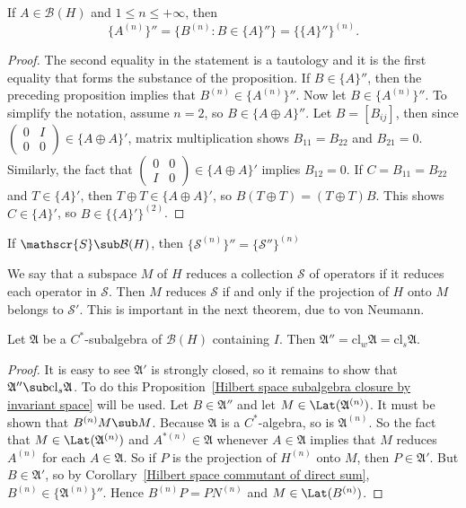 \begin{proposition}
If $A\in\mathcal{B}(H)$ and $1\leq n\leq+\infty$, then
\[\{A^{(n)}\}''=\{B^{(n)}:B\in\{A\}''\}=\{\{A\}''\}^{(n)}.\]
\end{proposition}
\begin{proof}
The second equality in the statement is a tautology and it is the first equality that forms the substance of the proposition. If $B\in\{A\}''$, then the preceding proposition implies that $B^{(n)}\in\{A^{(n)}\}''$. Now let $B\in\{A^{(n)}\}''$. To simplify the notation, assume $n=2$, so $B\in\{A\oplus A\}''$. Let $B=[B_{ij}]$, then since $(\begin{smallmatrix}0&I\\0&0\end{smallmatrix})\in\{A\oplus A\}'$, matrix multiplication shows $B_{11}=B_{22}$ and $B_{21}=0$. Similarly, the fact that $(\begin{smallmatrix}0&0\\I&0\end{smallmatrix})\in\{A\oplus A\}'$ implies $B_{12}=0$. If $C=B_{11}=B_{22}$ and $T\in\{A\}'$, then $T\oplus T\in\{A\oplus A\}'$, so $B(T\oplus T)=(T\oplus T)B$. This shows $C\in\{A\}'$, so $B\in\{\{A\}'\}^{(2)}$.
\end{proof}
\begin{corollary}\label{Hilbert space commutant of direct sum}
If $\mathscr{S}\sub\mathcal{B}(H)$, then $\{\mathcal{S}^{(n)}\}''=\{\mathscr{S}''\}^{(n)}$
\end{corollary}
We say that a subspace $M$ of $H$ reduces a collection $\mathscr{S}$ of operators if it reduces each operator in $\mathscr{S}$. Then $M$ reduces $\mathscr{S}$ if and only if the projection of $H$ onto $M$ belongs to $\mathscr{S}'$. This is important in the next theorem, due to von Neumann.
\begin{theorem}\label{Hilbert space bicommutant}
Let $\mathfrak{A}$ be a $C^*$-subalgebra of $\mathcal{B}(H)$ containing $I$. Then $\mathfrak{A}''=\mathrm{cl}_w\mathfrak{A}=\mathrm{cl}_s\mathfrak{A}$.
\end{theorem}
\begin{proof}
It is easy to see $\mathfrak{A}'$ is strongly closed, so it remains to show that $\mathfrak{A}''\sub\mathrm{cl}_s\mathfrak{A}$. To do this Proposition~\ref{Hilbert space subalgebra closure by invariant space} will be used. Let $B\in\mathfrak{A}''$ and let $M\in\Lat(\mathfrak{A}^{(n)})$. It must be shown that $B^{(n)}M\sub M$. Because $\mathfrak{A}$ is a $C^*$-algebra, so is $\mathfrak{A}^{(n)}$. So the fact that $M\in\Lat(\mathfrak{A}^{(n)})$ and $A^{*(n)}\in\mathfrak{A}$ whenever $A\in\mathfrak{A}$ implies that $M$ reduces $A^{(n)}$ for each $A\in\mathfrak{A}$. So if $P$ is the projection of $H^{(n)}$ onto $M$, then $P\in\mathfrak{A}'$. But $B\in\mathfrak{A}'$, so by Corollary~\ref{Hilbert space commutant of direct sum}, $B^{(n)}\in\{\mathfrak{A}^{(n)}\}''$. Hence $B^{(n)}P=PN^{(n)}$ and $M\in\Lat(B^{(n)})$.
\end{proof}
